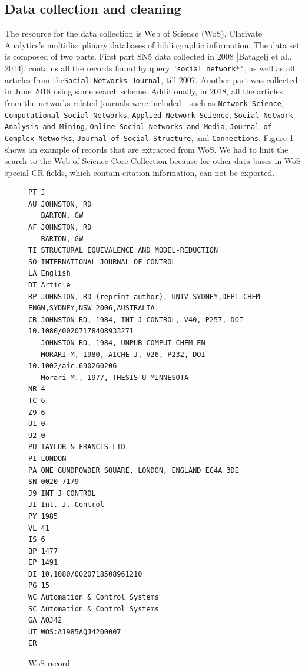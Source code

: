 \documentclass[11pt]{article} %
\begin{document}
\subsection{Data collection and cleaning}

The resource for the data collection is Web of Science (WoS), Clarivate Analytics’s multidisciplinary databases of bibliographic information. The data set is composed of two parts. First part SN5 data collected in 2008 [Batagelj et al., 2014], contains all the records found by query  \texttt {"social network*"}, as well as all articles from the\texttt{Social Networks Journal}, till 2007. Another part was collected in June 2018 using same search scheme. Additionally, in 2018, all the articles from the networks-related journals were included - such as  \texttt{Network Science}, \texttt{Computational Social Networks}, \texttt{Applied Network Science}, \texttt{Social Network Analysis and Mining}, \texttt{Online Social Networks and Media}, \texttt{Journal of Complex  Networks}, \texttt{Journal of Social Structure}, and \texttt{Connections}. Figure 1 shows an example of records that are extracted from WoS. We had to linit the search to the Web of Science Core Collection because for other data bases in WoS special CR fields, which contain citation information, can not be exported.

\begin{figure}
\renewcommand{\baselinestretch}{0.8}
\scriptsize
\begin{verbatim}
PT J
AU JOHNSTON, RD
   BARTON, GW
AF JOHNSTON, RD
   BARTON, GW
TI STRUCTURAL EQUIVALENCE AND MODEL-REDUCTION
SO INTERNATIONAL JOURNAL OF CONTROL
LA English
DT Article
RP JOHNSTON, RD (reprint author), UNIV SYDNEY,DEPT CHEM ENGN,SYDNEY,NSW 2006,AUSTRALIA.
CR JOHNSTON RD, 1984, INT J CONTROL, V40, P257, DOI 10.1080/00207178408933271
   JOHNSTON RD, 1984, UNPUB COMPUT CHEM EN
   MORARI M, 1980, AICHE J, V26, P232, DOI 10.1002/aic.690260206
   Morari M., 1977, THESIS U MINNESOTA
NR 4
TC 6
Z9 6
U1 0
U2 0
PU TAYLOR & FRANCIS LTD
PI LONDON
PA ONE GUNDPOWDER SQUARE, LONDON, ENGLAND EC4A 3DE
SN 0020-7179
J9 INT J CONTROL
JI Int. J. Control
PY 1985
VL 41
IS 6
BP 1477
EP 1491
DI 10.1080/0020718508961210
PG 15
WC Automation & Control Systems
SC Automation & Control Systems
GA AQJ42
UT WOS:A1985AQJ4200007
ER
\end{verbatim}
\caption{WoS record}\label{wos}
\end{figure}
\end{document}
